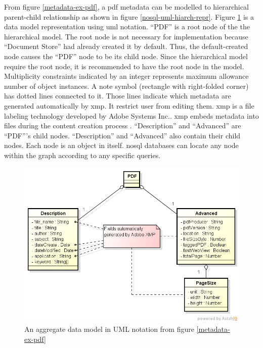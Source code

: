 From figure \ref{metadata-ex-pdf}, a \gls{pdf} metadata can be modelled to hierarchical parent-child relationship as shown in figure \ref{nosql-uml-hiarch-repr}.
Figure \ref{nosql-aggregate-uml} is a data model representation using \gls{uml} notation.
\enquote{PDF} is a root node of the the hierarchical model.
The root node is not necessary for implementation because \enquote{Document Store} had already created it by default.
Thus, the default-created node causes the \enquote{PDF} node to be its child node.
Since the hierarchical model require the root node, it is recommended to have the root node in the model.
Multiplicity constraints indicated by an integer represents maximum allowance number of object instances.
A note symbol (rectangle with right-folded corner) has dotted lines connected to it.
Those lines indicate which metadata are generated automatically by \gls{xmp}.
It restrict user from editing them.
\gls{xmp} is a file labeling technology developed by Adobe Systems Inc..
\gls{xmp} embeds metadata into files during the content creation process \cite{adobe-xml}.
\enquote{Description} and \enquote{Advanced} are \enquote{PDF}'s child nodes.
\enquote{Description} and \enquote{Advanced} also contain their child nodes.
Each node is an object in itself.
\gls{nosql} databases can locate any node within the graph according to any specific queries.
\begin{figure}[ht]
	\centering
	\includegraphics[scale=0.53]{res/bg-knowledge/nosql-nosql-agregate-uml}
	\caption{An aggregate data model in UML notation from figure \ref{metadata-ex-pdf}}
	\label{nosql-aggregate-uml}
\end{figure}
